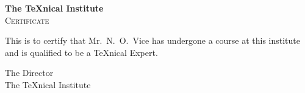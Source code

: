 \documentclass{letter}
\begin{document}
  \begin{center}
    {\bfseries\huge The \TeX nical Institute}\\[1 cm]
      {\scshape\LARGE Certificate}
  \end{center}

\noindent This is to certify that Mr.\ N.\ O.\ Vice has undergone a course at this institute and is qualified to be a \TeX nical Expert.

  \begin{flushright}
    {\sffamily The Director\\
    The \TeX nical Institute}
  \end{flushright}
\end{document}
